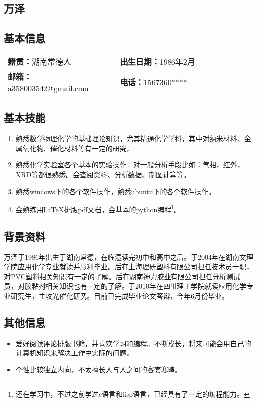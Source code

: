 \documentclass[11pt,oneside]{book}
\begin{document}
\begin{common-format}

\chapter{万泽}
\vspace{15pt}

\section{基本信息}

\noindent
\begin{tabular}{p{0.45\linewidth} p{0.45\linewidth}}
\textbf{籍贯：}湖南常德人 & \textbf{出生日期：}1986年2月 \\ 
\textbf{邮箱：}\href{mailto: a358003542@gmail.com}{a358003542@gmail.com} & \textbf{电话：}1567360**** \\ 
\end{tabular} 


\section{基本技能}
\vspace{-5mm}
\begin{enumerate}
\item 熟悉数学物理化学的基础理论知识，尤其精通化学学科，其中对纳米材料、金属氧化物、催化材料等有一定的研究。
\item 熟悉化学实验室各个基本的实验操作，对一般分析手段比如：气相，红外，XRD等都很熟悉。会查阅资料、分析数据、制图计算等。
\item 熟悉windows下的各个软件操作，熟悉ubuntu下的各个软件操作。
\item 会熟练用\LaTeX 排版pdf文档，会基本的python编程\footnote{还在学习中，不过之前学过c语言和lisp语言，已经具有了一定的编程能力。}。
\end{enumerate}


\section{背景资料}
万泽于1986年出生于湖南常德，在临澧读完初中和高中之后。于2004年在湖南文理学院应用化学专业就读并顺利毕业。后在上海理研塑料有限公司担任技术员一职，对PVC塑料相关知识有一定的了解。后在湖南神力胶业有限公司担任分析测试员，对胶粘剂相关知识也有一定的了解。于2010年在四川理工学院就读应用化学专业研究生，主攻光催化研究。目前已完成毕业论文答辩，今年6月份毕业。

\section{其他信息}
\vspace{-5mm}
\begin{itemize}
\item 爱好阅读评论排版书籍，并喜欢学习和编程。不断成长，将来可能会用自己的计算机知识来解决工作中实际的问题。
\item 个性比较独立内向，不太擅长人与人之间的客套寒暄。
\end{itemize}



\end{common-format}
\end{document}
